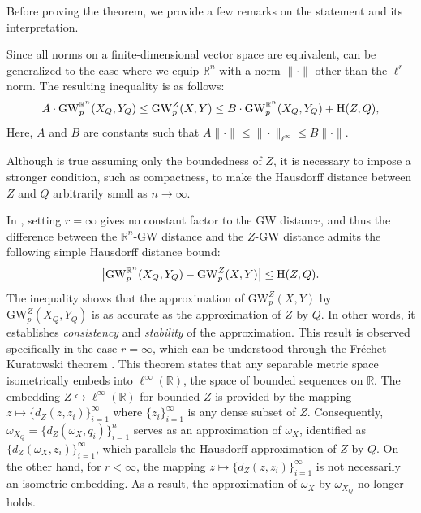 \documentclass[twoside,11pt]{article}
\theoremstyle{definition}
\newcommand{\dgwz}{\mathrm{GW}_p^Z}
\newcommand{\dgwRn}{\mathrm{GW}_p^{\mathbb{R}^n}}
\begin{document}
\begin{remark}
 Before proving the theorem, we provide a few remarks on the statement and its interpretation. 
 
\smallskip{}  Since all norms on a finite-dimensional vector space are equivalent,  can be generalized to the case where we equip $\mathbb{R}^n$ with a norm $\|\cdot\|$ other than the $\ell^r$ norm. The resulting inequality is as follows:
\begin{equation}
        A\cdot\dgwRn(X_{Q},Y_{Q}) \leq \dgwz(X, Y) \leq B\cdot\dgwRn(X_{Q}, Y_{Q}) + \textnormal{H}(Z,Q),
\end{equation}
Here, $A$ and $B$ are constants such that $A\|\cdot\|\leq \|\cdot\|_{\ell^{\infty}}\leq B\|\cdot\|$.

\smallskip
{}
Although  is true assuming only the boundedness of $Z$, it is necessary to impose a stronger condition, such as compactness, to make the Hausdorff distance between $Z$ and $Q$  arbitrarily small as $n \to \infty$. 

\smallskip
{}
In , setting $r=\infty$ gives no constant factor to the GW distance, and thus the difference between the $\mathbb{R}^n$-GW distance and the $Z$-GW distance admits the following simple Hausdorff distance bound:
\begin{equation}
\label{eqn:gw_approx_H}
\big|\dgwRn(X_{Q},Y_{Q})-\dgwz(X, Y)\big|\leq \textnormal{H}(Z,Q).
\end{equation} 
The inequality shows that the approximation of $\dgwz(X,Y)$ by $\dgwz(X_Q,Y_Q)$ is as accurate as the approximation of $Z$ by $Q$. In other words, it establishes  \emph{consistency} and \emph{stability} of the approximation. This result is observed specifically in the case $r=\infty$, which can be understood through the Fr\'{e}chet-Kuratowski theorem \citep[Proposition 1.17]{Ostrovskii+2013}. This theorem states that any separable metric space isometrically embeds into $\ell^{\infty}(\mathbb{R})$, the space of bounded sequences on $\mathbb{R}$. The embedding $Z \hookrightarrow \ell^{\infty}(\mathbb{R})$ for bounded $Z$ is provided by the mapping $z\mapsto \{d_Z(z,z_i)\}_{i=1}^{\infty}$ where $\{z_i\}_{i=1}^{\infty}$ is any dense subset of $Z$. Consequently, $\omega_{X_Q}=\{d_Z(\omega_X,q_i)\}_{i=1}^{n}$ serves as an approximation of $\omega_X$, identified as $\{d_Z(\omega_X,z_i)\}_{i=1}^{\infty}$, which parallels the Hausdorff approximation of $Z$ by $Q$. On the other hand, for $r<\infty$, the mapping $z\mapsto \{d_Z(z,z_i)\}_{i=1}^{\infty}$ is not necessarily an isometric embedding. As a result, the approximation of $\omega_X$ by $\omega_{X_Q}$ no longer holds.


\end{remark}
\end{document}
